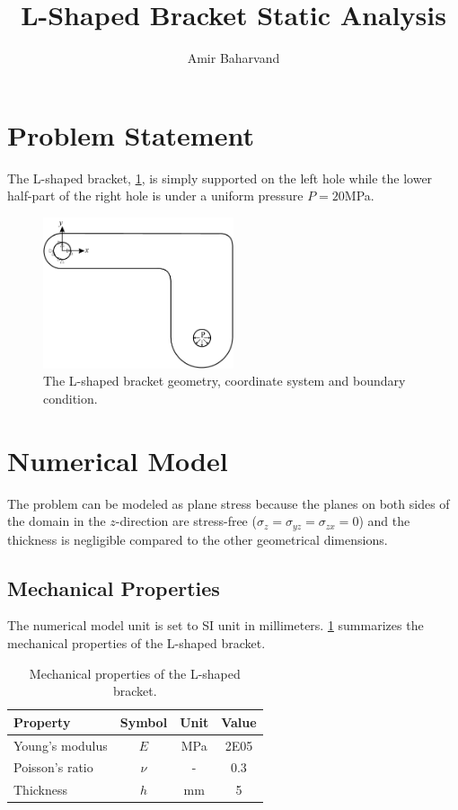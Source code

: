 \documentclass{article}
\title{L-Shaped Bracket Static Analysis}
\author{Amir Baharvand }
\date{}
\begin{document}
\maketitle

\section{Problem Statement}
The L-shaped bracket, \cref{fig:frame}, is simply supported on the left hole while the lower half-part of the right hole is under a uniform pressure $P = 20$MPa.

\begin{figure}[H]
    \centering
    \includegraphics[width = 0.5\textwidth ]{figures/frame.pdf}
    \caption{The L-shaped bracket geometry, coordinate system and boundary condition.}
    \label{fig:frame}
\end{figure}

\section{Numerical Model}
The problem can be modeled as plane stress because the planes on both sides of the domain in the $z$-direction are stress-free ($\sigma_z = \sigma_{yz} = \sigma_{zx} = 0$) and the thickness is negligible compared to the other geometrical dimensions.

\subsection{Mechanical Properties}
The numerical model unit is set to SI unit in millimeters. \cref{tab:mat_prop_frame} summarizes the mechanical properties of the L-shaped bracket.

\begin{table}[H]
    \centering
    \caption{Mechanical properties of the L-shaped bracket.}
    \begin{tabular}{l c c c} \hline
        Property & Symbol & Unit & Value \\ \hline
        Young's modulus & $E$& MPa & 2E05 \\
        Poisson's ratio & $\nu$ & - & 0.3 \\
        Thickness & $h$ & mm & 5 \\ \hline
    \end{tabular} 
    \label{tab:mat_prop_frame}
\end{table}
\end{document}
